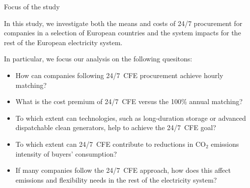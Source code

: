 \begin{frame}{Focus of the study}

  In this study, we investigate both the \alert{means and costs of 24/7 procurement} 
  for companies in a selection of European countries 
  and the \alert{system impacts} for the rest of the European electricity system. 
  
  \vspace{0.3cm}
  In particular, we focus our analysis on the following quesitons:
    \begin{itemize}
    \item How can companies following 24/7~CFE procurement achieve hourly matching?
    \item What is the cost premium of 24/7~CFE versus the 100\% annual matching?
    \item To which extent can technologies, such as long-duration storage or advanced dispatchable
          clean generators, help to achieve the 24/7~CFE goal?
    \item To which extent can 24/7~CFE contribute to reductions in CO$_2$
          emissions intensity of buyers' consumption? 
    \item If many companies follow the 24/7~CFE approach, how does this affect 
    emissions and flexibility needs in the rest of the electricity system?
    \end{itemize}

\end{frame}



